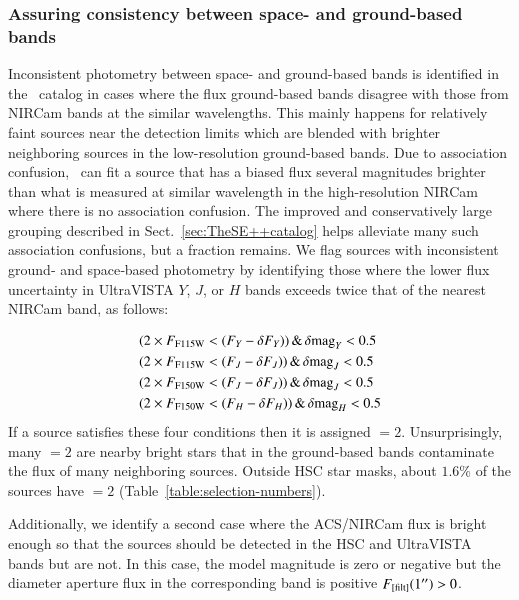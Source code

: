 \documentclass[longauth]{aa}
\begin{document}
\subsubsection{Assuring consistency between space- and ground-based bands} 
Inconsistent photometry between space- and ground-based bands is identified in the \SEpp\ catalog in cases where the flux ground-based bands disagree with those from NIRCam bands at the similar wavelengths. This mainly happens for relatively faint sources near the detection limits which are blended with brighter neighboring sources in the low-resolution ground-based bands. Due to association confusion, \SEpp\ can fit a source that has a biased flux several magnitudes brighter than what is measured at similar wavelength in the high-resolution NIRCam where there is no association confusion. The improved and conservatively large grouping described in Sect.~\ref{sec:TheSE++catalog} helps alleviate many such association confusions, but a fraction remains. We flag sources with inconsistent ground‑ and space‑based photometry by identifying those where the lower flux uncertainty in UltraVISTA $Y$, $J$, or $H$ bands exceeds twice that of the nearest NIRCam band, as follows:


\begin{equation}\label{condition_warn_fl_1}
\begin{split} 
& (2\times F_{\rm F115W} < (F_{Y} - \delta F_{Y} ) ) \, \& \, \delta {\rm mag}_{Y} < 0.5 \\
& (2\times F_{\rm F115W} < (F_{J} - \delta F_{J} ) ) \, \& \, \delta {\rm mag}_{J} < 0.5  \\
& (2\times F_{\rm F150W} < (F_{J} - \delta F_{J} ) ) \, \& \, \delta {\rm mag}_{J} < 0.5  \\
& (2\times F_{\rm F150W} < (F_{H} - \delta F_{H} ) ) \, \& \, \delta {\rm mag}_{H} < 0.5
\end{split}
\end{equation}
If a source satisfies these four conditions then it is assigned \warnfl$=2$. Unsurprisingly, many \warnfl$=2$ are nearby bright stars that in the ground-based bands contaminate the flux of many neighboring sources. Outside HSC star masks, about $1.6 \%$ of the sources have \warnfl$=2$ (Table~\ref{table:selection-numbers}).

Additionally, we identify a second case where the ACS/NIRCam flux is bright enough so that the sources should be detected in the HSC and UltraVISTA bands but are not. In this case, the model magnitude is zero or negative but the $\ang{;;}$ diameter aperture flux in the corresponding band is positive $F_{[\rm filt]} (1'')>0$.  
\end{document}
